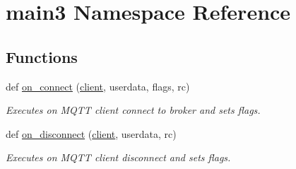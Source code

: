 \hypertarget{namespacemain3}{}\section{main3 Namespace Reference}
\label{namespacemain3}
\subsection*{Functions}
\begin{DoxyCompactItemize}
\item 
def \hyperlink{namespacemain3_a5c75165294c699dccf20a3a5105d1c83}{on\+\_\+connect} (\hyperlink{namespacemain3_ac22ae978a8b5a446c25462949448abe9}{client}, userdata, flags, rc)
\begin{DoxyCompactList}\small\item\em Executes on M\+Q\+TT client connect to broker and sets flags. \end{DoxyCompactList}\item 
def \hyperlink{namespacemain3_a18d6f3292241050eec8b3891f834ad5d}{on\+\_\+disconnect} (\hyperlink{namespacemain3_ac22ae978a8b5a446c25462949448abe9}{client}, userdata, rc)
\begin{DoxyCompactList}\small\item\em Executes on M\+Q\+TT client disconnect and sets flags. \end{DoxyCompactList}\end{DoxyCompactItemize}
